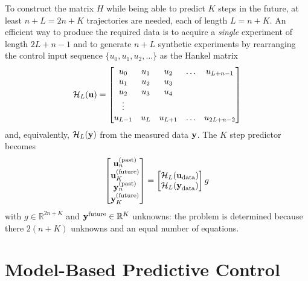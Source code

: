 To construct the matrix $H$ while being able to predict $K$ steps in the future, at least $n+L=2n+K$ trajectories are needed, each of length $L=n+K$. An efficient way to produce the required data is to acquire a \emph{single} experiment of length $2L+n-1$ and to generate $n+L$ synthetic experiments by rearranging the control input sequence $\{u_0, u_1, u_2,\ldots\}$ as the Hankel matrix
\begin{equation*}
  \mathcal{H}_L(\boldsymbol{\mathrm{u}}) =
  \begin{bmatrix}
    u_0 & u_1 & u_2 & \ldots & u_{L+n-1} \\
    u_1 & u_2 & u_3  \\
    u_2 & u_3 & u_4 \\
    \vdots \\
    u_{L-1} & u_L & u_{L+1} & \ldots & u_{2L+n-2}
  \end{bmatrix}
\end{equation*}
and, equivalently, $\mathcal{H}_L(\boldsymbol{\mathrm{y}})$ from the measured data $\boldsymbol{\mathrm{y}}$. The $K$ step predictor becomes
\begin{equation*}
  \label{eq:deepc-K-steps-predictor-H}
  \begin{bmatrix}
    \boldsymbol{\mathrm{u}}_n^{(\textrm{past})} \\ \boldsymbol{\mathrm{u}}_K^{(\textrm{future})} \\ \boldsymbol{\mathrm{y}}_n^{(\textrm{past})} \\ \boldsymbol{\mathrm{y}}_K^{(\textrm{future})}
  \end{bmatrix} =
  \begin{bmatrix}
    \mathcal{H}_L(\boldsymbol{\mathrm{u}}_\textrm{data}) \\ \mathcal{H}_L(\boldsymbol{\mathrm{y}}_\textrm{data})
  \end{bmatrix} g
\end{equation*}
with $g\in \mathbb{R}^{2n+K}$ and $\boldsymbol{\mathrm{y}}^\textrm{future}\in\mathbb{R}^K$ unknowns: the problem is determined because there $2(n+K)$ unknowns and an equal number of equations.


\section{Model-Based Predictive Control}
\label{sec:model-based-predictive-control}

